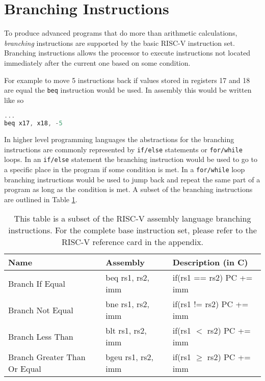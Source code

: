         
    \section{Branching Instructions}
        To produce advanced programs that do more than arithmetic calculations, \textit{branching} instructions are supported by the basic RISC-V instruction set.
        Branching instructions allows the processor to execute instructions not located immediately after the current one based on some condition. 
        
        For example to move 5 instructions back if values stored in registers 17 and 18 are equal the \texttt{beq} instruction would be used. In assembly this would be written like so
        \begin{lstlisting}[language=C]
...
beq x17, x18, -5
        \end{lstlisting}
        
        In higher level programming languages the abstractions for the branching instructions are commonly represented by \texttt{if/else} statements or \texttt{for/while} loops. In an \texttt{if/else} statement the branching instruction would be used to go to a specific place in the program if some condition is met. In a \texttt{for/while} loop branching instructions would be used to jump back and repeat the same part of a program as long as the condition is met. A subset of the branching instructions are outlined in Table \ref{table:RISCVBranchingInstructions}.
       
        \begin{table}[h!]
            \centering
            \begin{tabular}{|l|l|l|}
            	\hline
            	Name                         & Assembly           & Description (in C)          \\ \hline
            	Branch If Equal              & beq rs1, rs2, imm  & if(rs1 == rs2) PC += imm    \\
            	Branch Not Equal             & bne rs1, rs2, imm  & if(rs1 != rs2) PC += imm    \\
            	Branch Less Than             & blt rs1, rs2, imm  & if(rs1 $<$ rs2) PC += imm   \\
            	Branch Greater Than Or Equal & bgeu rs1, rs2, imm & if(rs1 $\ge$ rs2) PC += imm \\ \hline
            \end{tabular}
            \caption{This table is a subset of the RISC-V assembly language branching instructions. For the complete base instruction set, please refer to the RISC-V reference card in the appendix.}
            \label{table:RISCVBranchingInstructions}
        \end{table}
        
